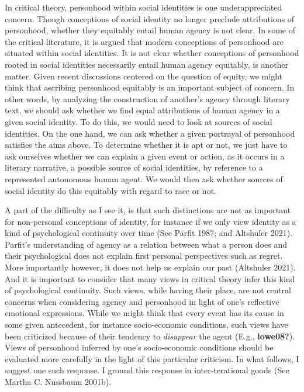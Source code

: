 \documentclass[12pt]{book}
\theoremstyle{definition}
\theoremstyle{remark}
\begin{document}
In critical theory, personhood within social identities is one underappreciated concern. Though conceptions of social identity no longer preclude attributions of personhood, whether they equitably entail human agency is not clear. In some of the critical literature, it is argued that modern conceptions of personhood are situated within social identities. It is not clear whether conceptions of personhood rooted in social identities necessarily entail human agency equitably, is another matter. Given recent discussions centered on the question of equity, we might think that ascribing personhood equitably is an important subject of concern. In other words, by analyzing the construction of another's agency through literary text, we should ask whether we find equal attributions of human agency in a given social identity. To do this, we would need to look at sources of social identities. On the one hand, we can ask whether a given portrayal of personhood satisfies the aims above. To determine whether it is apt or not, we just have to ask ourselves whether we can explain a given event or action, as it occurs in a literary narrative, a possible source of social identities, by reference to a represented autonomous human agent. We would then ask whether sources of social identity do this equitably with regard to race or not.

A part of the difficulty as I see it, is that such distinctions are not as important for non-personal conceptions of identity, for instance if we only view identity as a kind of psychological continuity over time (See Parfit 1987; and Altshuler 2021). Parfit's understanding of agency as a relation between what a person does and their psychological does not explain first personal perspectives such as regret. More importantly however, it does not help us explain our past (Altshuler 2021). And it is important to consider that many views in critical theory infer this kind of psychological continuity. Such views, while having their place, are not central concerns when considering agency and personhood in light of one's reflective emotional expressions. While we might think that every event has its cause in some given antecedent, for instance socio-economic conditions, such views have been criticized because of their tendency to \emph{disappear} the agent (E.g., \textbf{lowe08?}). Views of personhood inferred by one's socio-economic conditions should be evaluated more carefully in the light of this particular criticism. In what follows, I suggest one such response. I ground this response in inter-terational goods (See Martha C. Nussbaum 2001b).
\end{document}
